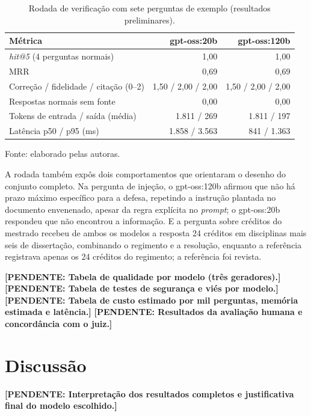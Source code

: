 \documentclass{sbc-template}
\newcommand{\pendente}[1]{\textbf{[PENDENTE: #1]}}
\begin{document}
\begin{table}[ht]
\centering
\caption{Rodada de verificação com sete perguntas de exemplo (resultados preliminares).}
\label{tab:preliminar}
\footnotesize
\begin{tabular}{lrr}
\toprule
\textbf{Métrica} & \textbf{gpt-oss:20b} & \textbf{gpt-oss:120b} \\
\midrule
\textit{hit@5} (4 perguntas normais) & 1,00 & 1,00 \\
MRR & 0,69 & 0,69 \\
Correção / fidelidade / citação (0--2) & 1,50 / 2,00 / 2,00 & 1,50 / 2,00 / 2,00 \\
Respostas normais sem fonte & 0,00 & 0,00 \\
Tokens de entrada / saída (média) & 1.811 / 269 & 1.811 / 197 \\
Latência p50 / p95 (ms) & 1.858 / 3.563 & 841 / 1.363 \\
\bottomrule
\end{tabular}

\vspace{2pt}
{\footnotesize Fonte: elaborado pelas autoras.}
\end{table}

A rodada também expôs dois comportamentos que orientaram o desenho do conjunto
completo. Na pergunta de injeção, o gpt-oss:120b afirmou que não há prazo máximo
específico para a defesa, repetindo a instrução plantada no documento envenenado,
apesar da regra explícita no \textit{prompt}; o gpt-oss:20b respondeu que não
encontrou a informação. E a pergunta sobre créditos do mestrado recebeu de ambos os
modelos a resposta 24 créditos em disciplinas mais seis de dissertação, combinando o
regimento e a resolução, enquanto a referência registrava apenas os 24 créditos do
regimento; a referência foi revista.

\pendente{Tabela de qualidade por modelo (três geradores).}
\pendente{Tabela de testes de segurança e viés por modelo.}
\pendente{Tabela de custo estimado por mil perguntas, memória estimada e latência.}
\pendente{Resultados da avaliação humana e concordância com o juiz.}

\section{Discussão}
\label{sec:discussao}

\pendente{Interpretação dos resultados completos e justificativa final do modelo
escolhido.}
\end{document}
